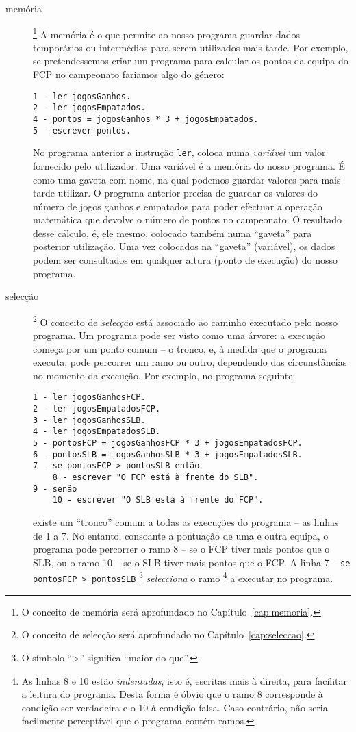 \begin{description}
\item[memória]\footnote{O conceito de memória será aprofundado no Capítulo~\ref{cap:memoria}.}
A memória é o que permite ao nosso programa guardar dados temporários ou intermédios para serem utilizados mais tarde.
Por exemplo, se pretendessemos criar um programa para calcular os pontos da equipa do FCP no campeonato fariamos algo do género:
\begin{verbatim}
1 - ler jogosGanhos.
2 - ler jogosEmpatados.
4 - pontos = jogosGanhos * 3 + jogosEmpatados.
5 - escrever pontos.
\end{verbatim}
No programa anterior a instrução \texttt{ler}, coloca numa \emph{variável} um valor fornecido pelo utilizador. Uma variável
é a memória do nosso programa. É como uma gaveta com nome, na qual podemos guardar valores para mais tarde utilizar.
O programa anterior precisa de guardar os valores do número de jogos ganhos e empatados para poder efectuar a operação matemática que devolve o número de pontos no campeonato. O resultado desse cálculo, é, ele mesmo, colocado também numa ``gaveta'' para posterior utilização. Uma vez colocados na ``gaveta'' (variável), os dados podem ser consultados em qualquer altura (ponto de execução) do nosso programa. 

\item[selecção] \footnote{O conceito de selecção será aprofundado no Capítulo~\ref{cap:seleccao}.}
O conceito de \emph{selecção} está associado ao caminho executado pelo nosso programa. Um programa pode ser visto como uma árvore: a execução começa por um ponto comum -- o tronco, e, à medida que o programa executa, pode percorrer um ramo ou outro, dependendo das circunstâncias no momento da execução.
Por exemplo, no programa seguinte:
\begin{verbatim}
1 - ler jogosGanhosFCP.
2 - ler jogosEmpatadosFCP.
3 - ler jogosGanhosSLB.
4 - ler jogosEmpatadosSLB.
5 - pontosFCP = jogosGanhosFCP * 3 + jogosEmpatadosFCP.
6 - pontosSLB = jogosGanhosSLB * 3 + jogosEmpatadosSLB.
7 - se pontosFCP > pontosSLB então
    8 - escrever "O FCP está à frente do SLB".
9 - senão
    10 - escrever "O SLB está à frente do FCP".     
\end{verbatim}

existe um ``tronco'' comum a todas as execuções do programa -- as linhas de 1 a 7.
No entanto, consoante a pontuação de uma e outra equipa, o programa pode percorrer o ramo 8 -- se o FCP tiver mais pontos que o SLB, ou o ramo 10 -- se o SLB tiver mais pontos que o FCP.
A linha 7 -- \texttt{se pontosFCP > pontosSLB}%
\footnote{O símbolo ``>'' significa ``maior do que''.}
\emph{selecciona} o ramo%
\footnote{As linhas 8 e 10 estão \emph{indentadas}, isto é, escritas mais à direita, para facilitar a leitura do programa. Desta forma é óbvio que o ramo 8 corresponde à condição ser verdadeira e o 10 à condição falsa. Caso contrário, não seria facilmente perceptível que o programa contém ramos.}
a executar no programa.


\end{description}
